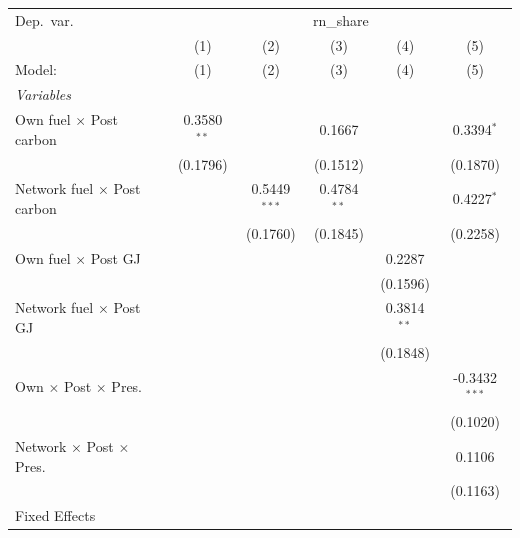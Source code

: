 \begingroup
\centering
\begin{tabular}{lccccc}
   \tabularnewline \midrule \midrule
   Dep.\ var. & \multicolumn{5}{c}{rn\_share}\\
                                          & (1)           & (2)            & (3)           & (4)           & (5) \\   
   Model:                                 & (1)           & (2)            & (3)           & (4)           & (5)\\  
   \midrule
   \emph{Variables}\\
   Own fuel $\times$ Post carbon          & 0.3580$^{**}$ &                & 0.1667        &               & 0.3394$^{*}$\\   
                                          & (0.1796)      &                & (0.1512)      &               & (0.1870)\\   
   Network fuel $\times$ Post carbon      &               & 0.5449$^{***}$ & 0.4784$^{**}$ &               & 0.4227$^{*}$\\   
                                          &               & (0.1760)       & (0.1845)      &               & (0.2258)\\   
   Own fuel $\times$ Post GJ              &               &                &               & 0.2287        &   \\   
                                          &               &                &               & (0.1596)      &   \\   
   Network fuel $\times$ Post GJ          &               &                &               & 0.3814$^{**}$ &   \\   
                                          &               &                &               & (0.1848)      &   \\   
   Own $\times$ Post $\times$ Pres.       &               &                &               &               & -0.3432$^{***}$\\   
                                          &               &                &               &               & (0.1020)\\   
   Network $\times$ Post $\times$ Pres.   &               &                &               &               & 0.1106\\   
                                          &               &                &               &               & (0.1163)\\   
   \midrule Fixed Effects\\

\end{tabular}
